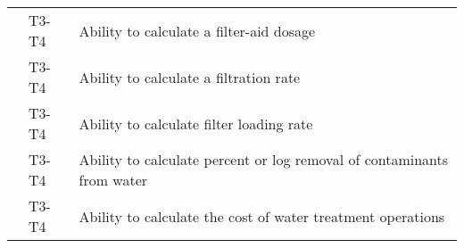 \begin{table}[H]
\begin{tabular}{| m{1cm} | m{1cm} | m{12cm} |}
\multicolumn{1}{l|}{} & \multicolumn{1}{l|}{T3-T4} & Ability to calculate   a filter-aid dosage                                   \\ \cline{2-3} 
\multicolumn{1}{l|}{} & \multicolumn{1}{l|}{T3-T4} & Ability to calculate   a filtration rate                                     \\ \cline{2-3} 
\multicolumn{1}{l|}{} & \multicolumn{1}{l|}{T3-T4} & Ability to calculate   filter loading rate                                   \\ \cline{2-3} 
\multicolumn{1}{l|}{} & \multicolumn{1}{l|}{T3-T4} & Ability to calculate   percent or log removal of contaminants from water     \\ \cline{2-3} 
\multicolumn{1}{l|}{} & \multicolumn{1}{l|}{T3-T4} & Ability to calculate   the cost of water treatment operations                \\ \cline{2-3} 
\end{tabular}
\end{table}
\newpage




